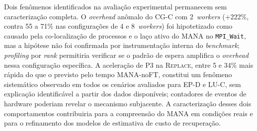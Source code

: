 Dois fenômenos identificados na avaliação experimental permanecem sem caracterização
completa. O \textit{overhead} anômalo do CG-C com 2~\textit{workers} ($+$222\%, contra
55 a 71\% nas configurações de 4 e 8~\textit{workers}) foi hipotetizado como causado
pela co-localização de processos e o laço ativo do MANA no \texttt{MPI\_Wait}, mas a
hipótese não foi confirmada por instrumentação interna do \textit{benchmark};
\textit{profiling} por \textit{rank} permitiria verificar se o padrão de espera amplifica
o \textit{overhead} nessa configuração específica. A aceleração de P3 na
\textsc{Replace}, entre 5 e 34\% mais rápida do que o previsto pelo tempo
MANA-noFT, constitui um fenômeno sistemático observado em todos os cenários avaliados
para EP-D e LU-C, sem explicação identificável a partir dos dados disponíveis;
contadores de eventos de hardware poderiam revelar o mecanismo subjacente. A
caracterização desses dois comportamentos contribuiria para a compreensão do MANA em
condições reais e para o refinamento dos modelos de estimativa de custo de recuperação.



